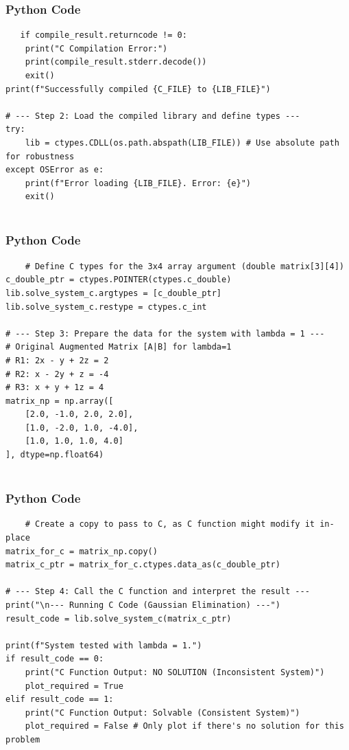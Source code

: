 \documentclass{beamer}
\begin{document}
    \begin{frame}[fragile]
        \frametitle{Python Code}
        \begin{lstlisting}
   if compile_result.returncode != 0:
    print("C Compilation Error:")
    print(compile_result.stderr.decode())
    exit()
print(f"Successfully compiled {C_FILE} to {LIB_FILE}")

# --- Step 2: Load the compiled library and define types ---
try:
    lib = ctypes.CDLL(os.path.abspath(LIB_FILE)) # Use absolute path for robustness
except OSError as e:
    print(f"Error loading {LIB_FILE}. Error: {e}")
    exit()


        \end{lstlisting}
    \end{frame}
    
    \begin{frame}[fragile]
        \frametitle{Python Code}
        \begin{lstlisting}
    # Define C types for the 3x4 array argument (double matrix[3][4])
c_double_ptr = ctypes.POINTER(ctypes.c_double)
lib.solve_system_c.argtypes = [c_double_ptr]
lib.solve_system_c.restype = ctypes.c_int

# --- Step 3: Prepare the data for the system with lambda = 1 ---
# Original Augmented Matrix [A|B] for lambda=1
# R1: 2x - y + 2z = 2
# R2: x - 2y + z = -4
# R3: x + y + 1z = 4
matrix_np = np.array([
    [2.0, -1.0, 2.0, 2.0],
    [1.0, -2.0, 1.0, -4.0],
    [1.0, 1.0, 1.0, 4.0]
], dtype=np.float64)


        \end{lstlisting}
    \end{frame}
    
    \begin{frame}[fragile]
        \frametitle{Python Code}
        \begin{lstlisting}
    # Create a copy to pass to C, as C function might modify it in-place
matrix_for_c = matrix_np.copy() 
matrix_c_ptr = matrix_for_c.ctypes.data_as(c_double_ptr)

# --- Step 4: Call the C function and interpret the result ---
print("\n--- Running C Code (Gaussian Elimination) ---")
result_code = lib.solve_system_c(matrix_c_ptr)

print(f"System tested with lambda = 1.")
if result_code == 0:
    print("C Function Output: NO SOLUTION (Inconsistent System)")
    plot_required = True
elif result_code == 1:
    print("C Function Output: Solvable (Consistent System)")
    plot_required = False # Only plot if there's no solution for this problem

        \end{lstlisting}
    \end{frame}
\end{document}
